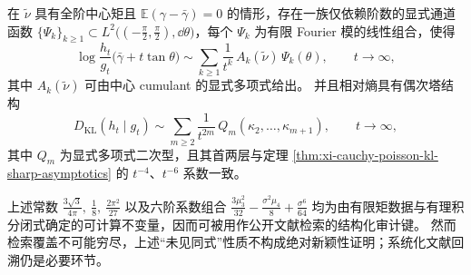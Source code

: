 \begin{conjecture}\label{conj:xi-cauchy-poisson-even-tower-channelization}
在 \(\tilde\nu\) 具有全阶中心矩且 \(\mathbb{E}(\gamma-\bar\gamma)=0\) 的情形，存在一族仅依赖阶数的显式通道函数 \(\{\Psi_k\}_{k\ge 1}\subset L^2\!\bigl((-\tfrac{\pi}{2},\tfrac{\pi}{2}),\dd\theta\bigr)\)，每个 \(\Psi_k\) 为有限 Fourier 模的线性组合，使得
\[
\log\frac{h_t}{g_t}\bigl(\bar\gamma+t\tan\theta\bigr)
\sim
\sum_{k\ge 1}\frac{1}{t^k}\,A_k(\tilde\nu)\,\Psi_k(\theta),
\qquad t\to\infty,
\]
其中 \(A_k(\tilde\nu)\) 可由中心 cumulant 的显式多项式给出。
并且相对熵具有偶次塔结构
\[
D_{\mathrm{KL}}(h_t\mid g_t)\sim \sum_{m\ge 2}\frac{1}{t^{2m}}\,Q_m(\kappa_2,\dots,\kappa_{m+1}),
\qquad t\to\infty,
\]
其中 \(Q_m\) 为显式多项式二次型，且其首两层与定理 \ref{thm:xi-cauchy-poisson-kl-sharp-asymptotics} 的 \(t^{-4}\)、\(t^{-6}\) 系数一致。
\end{conjecture}

\begin{remark}[常数向量作为可执行审计键]\label{rem:xi-cauchy-poisson-audit-keys}
上述常数
\(
\frac{3\sqrt3}{4\pi},\ \frac18,\ \frac{2\pi^2}{27}
\)
以及六阶系数组合
\(
\frac{3\mu_3^2}{32}-\frac{\sigma^2\mu_4}{8}+\frac{\sigma^6}{64}
\)
均为由有限矩数据与有理积分闭式确定的可计算不变量，因而可被用作公开文献检索的结构化审计键。
然而检索覆盖不可能穷尽，上述“未见同式”性质不构成绝对新颖性证明；系统化文献回溯仍是必要环节。
\end{remark}

\endinput
